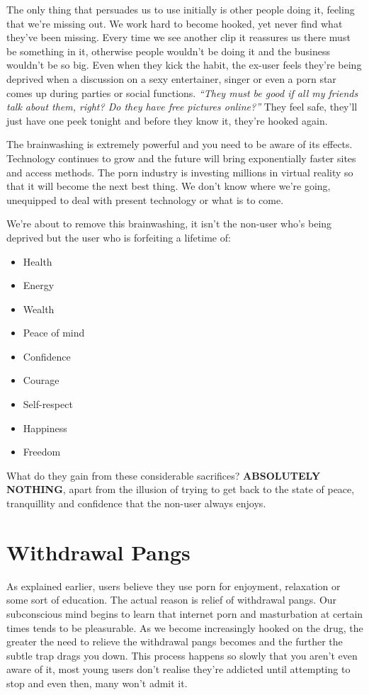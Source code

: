 \documentclass[
]{book}
\begin{document}
The only thing that persuades us to use initially is other people doing it, feeling that we're missing out. We work hard to become hooked, yet never find what they've been missing. Every time we see another clip it reassures us there must be something in it, otherwise people wouldn't be doing it and the business wouldn't be so big. Even when they kick the habit, the ex-user feels they're being deprived when a discussion on a sexy entertainer, singer or even a porn star comes up during parties or social functions. \emph{``They must be good if all my friends talk about them, right? Do they have free pictures online?''} They feel safe, they'll just have one peek tonight and before they know it, they're hooked again.

The brainwashing is extremely powerful and you need to be aware of its effects. Technology continues to grow and the future will bring exponentially faster sites and access methods. The porn industry is investing millions in virtual reality so that it will become the next best thing. We don't know where we're going, unequipped to deal with present technology or what is to come.

We're about to remove this brainwashing, it isn't the non-user who's being deprived but the user who is forfeiting a lifetime of:

\begin{itemize}
\item
  Health
\item
  Energy
\item
  Wealth
\item
  Peace of mind
\item
  Confidence
\item
  Courage
\item
  Self-respect
\item
  Happiness
\item
  Freedom
\end{itemize}

What do they gain from these considerable sacrifices? \textbf{ABSOLUTELY NOTHING}, apart from the illusion of trying to get back to the state of peace, tranquillity and confidence that the non-user always enjoys.

\hypertarget{withdrawal-pangs}{%
\section{Withdrawal Pangs}\label{withdrawal-pangs}}

As explained earlier, users believe they use porn for enjoyment, relaxation or some sort of education. The actual reason is relief of withdrawal pangs. Our subconscious mind begins to learn that internet porn and masturbation at certain times tends to be pleasurable. As we become increasingly hooked on the drug, the greater the need to relieve the withdrawal pangs becomes and the further the subtle trap drags you down. This process happens so slowly that you aren't even aware of it, most young users don't realise they're addicted until attempting to stop and even then, many won't admit it.
\end{document}
